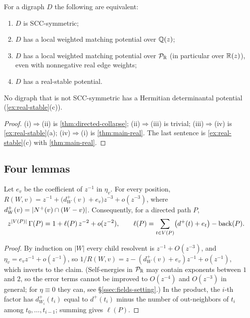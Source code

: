 \begin{corollary}\label{cor:characterization}
For a digraph $D$ the following are equivalent:
\begin{enumerate}[label=\textup{(\roman*)}]
\item $D$ is SCC-symmetric;
\item $D$ has a local weighted matching potential over $\Qz$;
\item $D$ has a local weighted matching potential over $\Puis$ \textup{(}in particular over $\Rz$\textup{)}, even with nonnegative real edge weights;
\item $D$ has a real-stable potential.
\end{enumerate}
No digraph that is not SCC-symmetric has a Hermitian determinantal potential \textup{(}\cref{ex:real-stable}\textup{(c))}.
\end{corollary}
\begin{proof}
(i)$\Rightarrow$(ii) is \cref{thm:directed-collapse}; (ii)$\Rightarrow$(iii) is trivial; (iii)$\Rightarrow$(iv) is \cref{ex:real-stable}(a); (iv)$\Rightarrow$(i) is \cref{thm:main-real}. The last sentence is \cref{ex:real-stable}(c) with \cref{thm:main-real}.
\end{proof}

\subsection{Four lemmas}

\begin{lemma}\label{lem:asymptotics}
Let $e_v$ be the coefficient of $z^{-1}$ in $\eta_v$. For every position, $R(W,v)=z^{-1}+\bigl(d^{+}_W(v)+e_v\bigr)z^{-3}+o(z^{-3})$, where $d^{+}_W(v)=|\nplus(v)\cap(W-v)|$. Consequently, for a directed path $P$,
\[
z^{|V(P)|}\,\Gamma(P)=1+\ell(P)\,z^{-2}+o(z^{-2}),\qquad \ell(P)=\sum_{t\in V(P)}\bigl(d^{+}(t)+e_t\bigr)-\back(P).
\]
\end{lemma}
\begin{proof}
By induction on $|W|$ every child resolvent is $z^{-1}+O(z^{-3})$, and $\eta_v=e_vz^{-1}+o(z^{-1})$, so $1/R(W,v)=z-(d^{+}_W(v)+e_v)z^{-1}+o(z^{-1})$, which inverts to the claim. (Self-energies in $\Puis$ may contain exponents between $1$ and $2$, so the error terms cannot be improved to $O(z^{-4})$ and $O(z^{-3})$ in general; for $\eta\equiv0$ they can, see \S\ref{ssec:fields-setting}.) In the product, the $i$-th factor has $d^{+}_{W_i}(t_i)$ equal to $d^{+}(t_i)$ minus the number of out-neighbors of $t_i$ among $t_0,\dots,t_{i-1}$; summing gives $\ell(P)$.
\end{proof}

